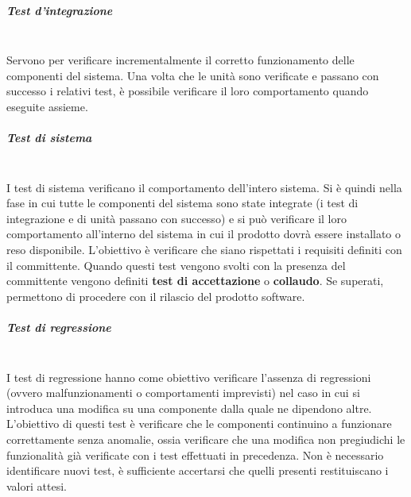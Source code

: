 \subparagraph{Test d’integrazione} \mbox{}\\
Servono per verificare incrementalmente il corretto funzionamento delle componenti del sistema.
Una volta che le unità sono verificate e passano con successo i relativi test, è possibile verificare il loro comportamento quando eseguite assieme.

\subparagraph{Test di sistema} \mbox{}\\
I test di sistema verificano il comportamento dell’intero sistema.
Si è quindi nella fase in cui tutte le componenti del sistema sono state integrate (i test di integrazione e di unità passano con successo) e si può verificare il loro comportamento all’interno del sistema in cui il prodotto dovrà essere installato o reso disponibile.
L'obiettivo è verificare che siano rispettati i requisiti definiti con il committente.
Quando questi test vengono svolti con la presenza del committente vengono definiti \textbf{test di accettazione} o \textbf{collaudo}. Se superati, permettono di procedere con il rilascio del prodotto software.

\subparagraph{Test di regressione} \mbox{}\\
I test di regressione hanno come obiettivo verificare l'assenza di regressioni (ovvero malfunzionamenti o comportamenti imprevisti) nel caso in cui si introduca una modifica su una componente dalla quale ne dipendono altre.
L'obiettivo di questi test è verificare che le componenti continuino a funzionare correttamente senza anomalie, ossia verificare che una modifica non pregiudichi le funzionalità già verificate con i test effettuati in precedenza.
Non è necessario identificare nuovi test, è sufficiente accertarsi che quelli presenti restituiscano i valori attesi.

